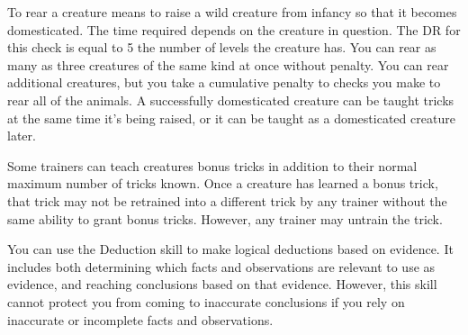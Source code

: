          To rear a creature means to raise a wild creature from infancy so that it becomes domesticated. The time required depends on the creature in question. The DR for this check is equal to 5 \add the number of levels the creature has. You can rear as many as three creatures of the same kind at once without penalty. You can rear additional creatures, but you take a cumulative  penalty to checks you make to rear all of the animals. A successfully domesticated creature can be taught tricks at the same time it's being raised, or it can be taught as a domesticated creature later.

        \label{Bonus Tricks} Some trainers can teach creatures bonus tricks in addition to their normal maximum number of tricks known.
        Once a creature has learned a bonus trick, that trick may not be retrained into a different trick by any trainer without the same ability to grant bonus tricks.
        However, any trainer may untrain the trick.

\newpage
{}
    You can use the Deduction skill to make logical deductions based on evidence.
    It includes both determining which facts and observations are relevant to use as evidence, and reaching conclusions based on that evidence.
    However, this skill cannot protect you from coming to inaccurate conclusions if you rely on inaccurate or incomplete facts and observations.

